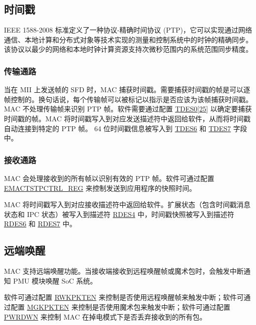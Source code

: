 \documentclass[main\_\_CN.tex]{subfiles}
\begin{document}
\subsection{时间戳}
IEEE 1588-2008 标准定义了一种协议-精确时间协议 (PTP)，它可以实现通过网络通信、本地计算和分布式对象等技术实现的测量和控制系统中的时钟的精确同步。该协议以最少的网络和本地时钟计算资源支持次微秒范围内的系统范围同步精度。

\subsubsection{传输通路}
当在 MII 上发送帧的 SFD 时，MAC 捕获时间戳。需要捕获时间戳的帧是可以逐帧控制的。换句话说，每个传输帧可以被标记以指示是否应该为该帧捕获时间戳。MAC 不处理传输帧来识别 PTP 帧。软件需要通过配置 \hyperref[tab:ethernetmac-TDES0]{TDES0[25]} 以确定要捕获时间戳的帧。MAC 将时间戳写入到对应发送描述符中返回给软件，从而将时间戳自动连接到特定的 PTP 帧。 64 位时间戳信息被写入到 \hyperref[tab:ethernetmac-TDES6]{TDES6} 和 \hyperref[tab:ethernetmac-TDES7]{TDES7} 字段中。

\subsubsection{接收通路}
MAC 会处理接收到的所有帧以识别有效的 PTP 帧。软件可通过配置 \hyperref[regdesc:EMACTIMESTAMPCONTROLREG]{EMACTSTPCTRL\_REG} 来控制发送到应用程序的快照时间。

MAC 将时间戳写入到对应接收描述符中返回给软件。扩展状态（包含时间戳消息状态和 IPC 状态）被写入到描述符 \hyperref[tab:ethernetmac-RDES4]{RDES4} 中，时间戳快照被写入到描述符 \hyperref[tab:ethernetmac-RDES6]{RDES6} 和 \hyperref[tab:ethernetmac-RDES7]{RDES7} 中。

\subsection{远端唤醒}
MAC 支持远端唤醒功能。当接收端接收到远程唤醒帧或魔术包时，会触发中断通知 PMU 模块唤醒 SoC 系统。

软件可通过配置 \hyperref[regdesc:PMTCSRREG]{RWKPKTEN} 来控制是否使用远程唤醒帧来触发中断；软件可通过配置 \hyperref[regdesc:PMTCSRREG]{MGKPKTEN} 来控制是否使用魔术包来触发中断；软件可通过配置 \hyperref[regdesc:PMTCSRREG]{PWRDWN} 来控制 MAC 在掉电模式下是否丢弃接收到的所有包。
\end{document}
